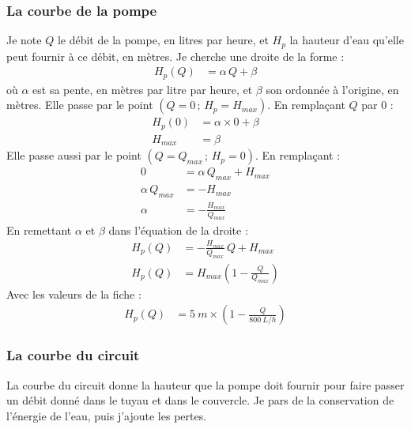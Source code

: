 \subsubsection*{La courbe de la pompe}

\begin{demonstration}
Je note $Q$ le débit de la pompe, en litres par heure, et $H_p$ la hauteur d'eau qu'elle peut fournir à ce débit, en mètres. Je cherche une droite de la forme :
\begin{align*}
H_p(Q) &= \alpha\,Q + \beta
\end{align*}
où $\alpha$ est sa pente, en mètres par litre par heure, et $\beta$ son ordonnée à l'origine, en mètres. Elle passe par le point $(Q = 0\,;\,H_p = H_{max})$. En remplaçant $Q$ par $0$ :
\begin{align*}
H_p(0) &= \alpha \times 0 + \beta\\
H_{max} &= \beta
\end{align*}
Elle passe aussi par le point $(Q = Q_{max}\,;\,H_p = 0)$. En remplaçant :
\begin{align*}
0 &= \alpha\, Q_{max} + H_{max}\\
\alpha\, Q_{max} &= -H_{max}\\
\alpha &= -\frac{H_{max}}{Q_{max}}
\end{align*}
En remettant $\alpha$ et $\beta$ dans l'équation de la droite :
\begin{align*}
H_p(Q) &= -\frac{H_{max}}{Q_{max}}\,Q + H_{max}\\
H_p(Q) &= H_{max}\left(1 - \frac{Q}{Q_{max}}\right)
\end{align*}
Avec les valeurs de la fiche :
\begin{align*}
H_p(Q) &= \qty{5}{m}\times\left(1 - \frac{Q}{\qty{800}{L/h}}\right)
\end{align*}
\end{demonstration}

\subsubsection*{La courbe du circuit}

La courbe du circuit donne la hauteur que la pompe doit fournir pour faire passer un débit donné dans le tuyau et dans le couvercle. Je pars de la conservation de l'énergie de l'eau, puis j'ajoute les pertes.

